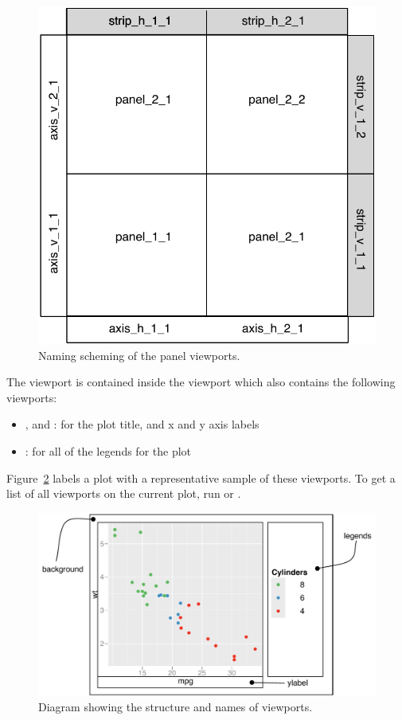 \begin{figure}[htbp]
  \centering
    \includegraphics[width=0.5 \linewidth]{grid-panelvp}
  \caption{Naming scheming of the panel viewports.}
  \label{fig:panelvp}
\end{figure}

The  viewport is contained inside the  viewport which also contains the following viewports:

\begin{itemize}
  \item {},  and : for the plot title, and x and y axis labels
  \item {}: for all of the legends for the plot
\end{itemize}

\noindent Figure~\ref{fig:viewports} labels a plot with a representative sample of these viewports.  To get a list of all viewports on the current plot, run  or .

\begin{figure}[htbp]
  \centering
    \includegraphics[width=\linewidth]{grid-viewports}
  \caption{Diagram showing the structure and names of viewports.}
  \label{fig:viewports}
\end{figure}

